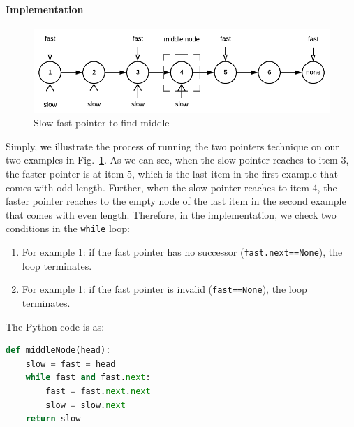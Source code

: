\documentclass[../main.tex]{subfiles}
\begin{document}
\paragraph{Implementation}
\begin{figure}[h]
    \centering
    \includegraphics[width = 0.98\columnwidth]{fig/middle_of_linked_list.png}
    \caption{Slow-fast pointer to find middle}
    \label{fig:slow-faster}
\end{figure}
Simply, we  illustrate the process of running the two pointers technique on our two examples in Fig.~\ref{fig:slow-faster}. As we can see, when the slow pointer reaches to item 3, the faster pointer is at item 5, which is the last item in the first example that comes with odd length. Further, when the slow pointer reaches to item 4, the faster pointer reaches to the empty node of the last item in the second example that comes with even length. Therefore, in the implementation, we check two conditions in the \texttt{while} loop: 
\begin{enumerate}
    \item For example 1: if the fast pointer has no successor (\texttt{fast.next==None}), the loop terminates.
    \item For example 1: if the fast pointer is invalid (\texttt{fast==None}), the loop terminates.
\end{enumerate}
The Python code is as:
\begin{lstlisting}[language=Python]
def middleNode(head):
    slow = fast = head
    while fast and fast.next:        
        fast = fast.next.next
        slow = slow.next     
    return slow
\end{lstlisting}
\end{document}
